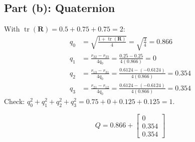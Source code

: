\documentclass[11pt]{article}
\newcommand{\R}{\bm{R}}
\begin{document}
\subsection*{Part (b): Quaternion}
With $\operatorname{tr}(\R) = 0.5 + 0.75 + 0.75 = 2$:
\begin{align*}
    q_0 &= \sqrt{\frac{1 + \operatorname{tr}(\R)}{4}} = \sqrt{\frac{3}{4}} = 0.866\\[2pt]
    q_1 &= \frac{r_{32} - r_{23}}{4q_0} = \frac{0.25 - 0.25}{4(0.866)} = 0\\[2pt]
    q_2 &= \frac{r_{13} - r_{31}}{4q_0} = \frac{0.6124 - (-0.6124)}{4(0.866)} = 0.354\\[2pt]
    q_3 &= \frac{r_{21} - r_{12}}{4q_0} = \frac{0.6124 - (-0.6124)}{4(0.866)} = 0.354
\end{align*}
Check: $q_0^2 + q_1^2 + q_2^2 + q_3^2 = 0.75 + 0 + 0.125 + 0.125 = 1$.
\begin{result}
\[
    Q = 0.866 + \begin{bmatrix} 0\\ 0.354\\ 0.354 \end{bmatrix}
\]
\end{result}
\end{document}
